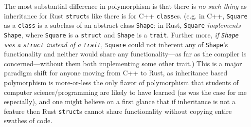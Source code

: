\documentclass{report}
\begin{document}
The most substantial difference in polymorphism is that there is \emph{no such
thing} as inheritance for Rust \texttt{struct}s like there is for C++
\texttt{class}es. (e.g. in C++, \texttt{Square} as a \texttt{class} is a subclass of
an abstract class \texttt{Shape};
in Rust, \texttt{Square} \emph{implements} \texttt{Shape}, where \texttt{Square} is a
\texttt{struct} and \texttt{Shape} is a \texttt{trait}. Further more, \emph{if
\texttt{Shape} was a \texttt{struct} instead of a \texttt{trait}},
\texttt{Square} could not inherent any of \texttt{Shape}'s functionality and neither
would share any functionality---as far as the compiler is concerned---without
them both implementing some other trait.)
This is a major paradigm shift for anyone moving from C++ to Rust, as
inheritance based polymorphism is more-or-less the only flavor of polymorphism
that students of computer science/programming are likely to have learned (as was
the case for me especially), and one might believe on a first glance that if
inheritance is not a feature then Rust \texttt{struct}s cannot share functionality
without copying entire swathes of code.
\end{document}
